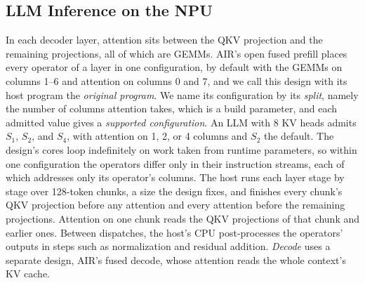 \subsection{LLM Inference on the NPU}
\label{subsec:prefill}

In each decoder layer, attention sits between the QKV projection and the remaining projections, all of which are GEMMs.
AIR's open fused prefill places every operator of a layer in one configuration, by default with the GEMMs on columns 1--6 and attention on columns 0 and 7, and we call this design with its host program the \emph{original program}.
We name its configuration by its \emph{split}, namely the number of columns attention takes, which is a build parameter, and each admitted value gives a \emph{supported configuration}.
An LLM with 8 KV heads admits $S_1$, $S_2$, and $S_4$, with attention on 1, 2, or 4 columns and $S_2$ the default.
The design's cores loop indefinitely on work taken from runtime parameters, so within one configuration the operators differ only in their instruction streams, each of which addresses only its operator's columns.
The host runs each layer stage by stage over 128-token chunks, a size the design fixes, and finishes every chunk's QKV projection before any attention and every attention before the remaining projections.
Attention on one chunk reads the QKV projections of that chunk and earlier ones.
Between dispatches, the host's CPU post-processes the operators' outputs in steps such as normalization and residual addition.
\emph{Decode} uses a separate design, AIR's fused decode, whose attention reads the whole context's KV cache.

